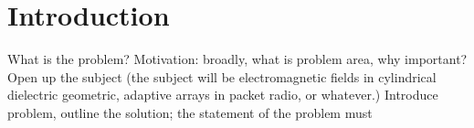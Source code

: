 \section{Introduction}\label{sec:introduction}
What is the problem? Motivation: broadly, what is problem area,
why important? Open up the subject (the subject will be electromagnetic
fields in cylindrical dielectric geometric, adaptive arrays in packet radio,
or whatever.)
Introduce problem, outline the solution; the statement of the problem must
